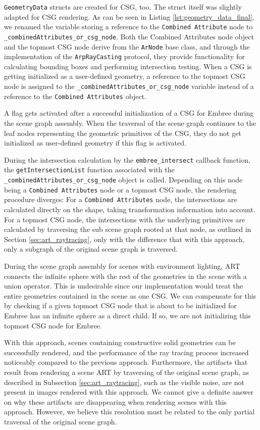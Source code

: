 \texttt{GeometryData} structs are created for CSG, too. The struct itself was slightly adapted for CSG rendering. As can be seen in Listing \ref{lst:geometry_data_final}, we renamed the variable storing a reference to the \texttt{Combined Attribute} node to \texttt{\_combinedAttributes\_or\_csg\_node}. Both the Combined Attributes node object and the topmost CSG node derive from the \texttt{ArNode} base class, and through the implementation of the \texttt{ArpRayCasting} protocol, they provide functionality for calculating bounding boxes and performing intersection testing.
When a CSG is getting initialized as a user-defined geometry, a reference to the topmost CSG node is assigned to the
\texttt{\_combinedAttributes\_or\_csg\_node} variable instead of a reference to the \texttt{Combined Attributes} object.

A flag gets activated after a successful initialization of a CSG for Embree during the scene graph assembly. When the traversal of the scene graph continues to the leaf nodes representing the geometric primitives of the CSG, they do not get initialized as user-defined geometry if this flag is activated.

During the intersection calculation by the \texttt{embree\_intersect} callback function, the \texttt{getIntersectionList} function associated with the \texttt{\_combinedAttributes\_or\_csg\_node} object is called. Depending on this node being a \texttt{Combined Attributes} node or a topmost CSG node, the rendering procedure diverges: For a \texttt{Combined Attributes} node, the intersections are calculated directly on the shape, taking transformation information into account. For a topmost CSG node, the intersections with the underlying primitives are calculated by traversing the sub scene graph rooted at that node, as outlined in Section \ref{sec:art_raytracing}, only with the difference that with this approach, only a subgraph of the original scene graph is traversed.

During the scene graph assembly for scenes with environment lighting, ART connects the infinite sphere with the rest of the geometries in the scene with a union operator. This is undesirable since our implementation would treat the entire geometries contained in the scene as one CSG. We can compensate for this by checking if a given topmost CSG node that is about to be initialized for Embree has an infinite sphere as a direct child. If so, we are not initializing this topmost CSG node for Embree.

With this approach, scenes containing constructive solid geometries can be successfully rendered, and the performance of the ray tracing process increased noticeably compared to the previous approach. Furthermore, the artifacts that result from rendering a scene ART by traversing of the original scene graph, as described in Subsection \ref{sec:art_raytracing}, such as the visible noise, are not present in images rendered with this approach. We cannot give a definite answer on why these artifacts are disappearing when rendering scenes with this approach. However, we believe this resolution must be related to the only partial traversal of the original scene graph.

